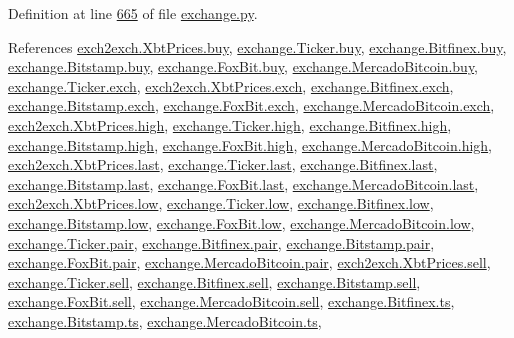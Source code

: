 Definition at line \hyperlink{exchange_8py_source_l00665}{665} of file \hyperlink{exchange_8py_source}{exchange.\+py}.



References \hyperlink{exch2exch_8py_source_l00059}{exch2exch.\+Xbt\+Prices.\+buy}, \hyperlink{exchange_8py_source_l00060}{exchange.\+Ticker.\+buy}, \hyperlink{exchange_8py_source_l00430}{exchange.\+Bitfinex.\+buy}, \hyperlink{exchange_8py_source_l00502}{exchange.\+Bitstamp.\+buy}, \hyperlink{exchange_8py_source_l00574}{exchange.\+Fox\+Bit.\+buy}, \hyperlink{exchange_8py_source_l00642}{exchange.\+Mercado\+Bitcoin.\+buy}, \hyperlink{exchange_8py_source_l00057}{exchange.\+Ticker.\+exch}, \hyperlink{exch2exch_8py_source_l00064}{exch2exch.\+Xbt\+Prices.\+exch}, \hyperlink{exchange_8py_source_l00424}{exchange.\+Bitfinex.\+exch}, \hyperlink{exchange_8py_source_l00499}{exchange.\+Bitstamp.\+exch}, \hyperlink{exchange_8py_source_l00567}{exchange.\+Fox\+Bit.\+exch}, \hyperlink{exchange_8py_source_l00639}{exchange.\+Mercado\+Bitcoin.\+exch}, \hyperlink{exch2exch_8py_source_l00061}{exch2exch.\+Xbt\+Prices.\+high}, \hyperlink{exchange_8py_source_l00062}{exchange.\+Ticker.\+high}, \hyperlink{exchange_8py_source_l00432}{exchange.\+Bitfinex.\+high}, \hyperlink{exchange_8py_source_l00504}{exchange.\+Bitstamp.\+high}, \hyperlink{exchange_8py_source_l00576}{exchange.\+Fox\+Bit.\+high}, \hyperlink{exchange_8py_source_l00644}{exchange.\+Mercado\+Bitcoin.\+high}, \hyperlink{exch2exch_8py_source_l00063}{exch2exch.\+Xbt\+Prices.\+last}, \hyperlink{exchange_8py_source_l00064}{exchange.\+Ticker.\+last}, \hyperlink{exchange_8py_source_l00434}{exchange.\+Bitfinex.\+last}, \hyperlink{exchange_8py_source_l00506}{exchange.\+Bitstamp.\+last}, \hyperlink{exchange_8py_source_l00578}{exchange.\+Fox\+Bit.\+last}, \hyperlink{exchange_8py_source_l00646}{exchange.\+Mercado\+Bitcoin.\+last}, \hyperlink{exch2exch_8py_source_l00062}{exch2exch.\+Xbt\+Prices.\+low}, \hyperlink{exchange_8py_source_l00063}{exchange.\+Ticker.\+low}, \hyperlink{exchange_8py_source_l00433}{exchange.\+Bitfinex.\+low}, \hyperlink{exchange_8py_source_l00505}{exchange.\+Bitstamp.\+low}, \hyperlink{exchange_8py_source_l00577}{exchange.\+Fox\+Bit.\+low}, \hyperlink{exchange_8py_source_l00645}{exchange.\+Mercado\+Bitcoin.\+low}, \hyperlink{exchange_8py_source_l00058}{exchange.\+Ticker.\+pair}, \hyperlink{exchange_8py_source_l00425}{exchange.\+Bitfinex.\+pair}, \hyperlink{exchange_8py_source_l00500}{exchange.\+Bitstamp.\+pair}, \hyperlink{exchange_8py_source_l00568}{exchange.\+Fox\+Bit.\+pair}, \hyperlink{exchange_8py_source_l00640}{exchange.\+Mercado\+Bitcoin.\+pair}, \hyperlink{exch2exch_8py_source_l00058}{exch2exch.\+Xbt\+Prices.\+sell}, \hyperlink{exchange_8py_source_l00061}{exchange.\+Ticker.\+sell}, \hyperlink{exchange_8py_source_l00431}{exchange.\+Bitfinex.\+sell}, \hyperlink{exchange_8py_source_l00503}{exchange.\+Bitstamp.\+sell}, \hyperlink{exchange_8py_source_l00575}{exchange.\+Fox\+Bit.\+sell}, \hyperlink{exchange_8py_source_l00643}{exchange.\+Mercado\+Bitcoin.\+sell}, \hyperlink{exchange_8py_source_l00428}{exchange.\+Bitfinex.\+ts}, \hyperlink{exchange_8py_source_l00501}{exchange.\+Bitstamp.\+ts}, \hyperlink{exchange_8py_source_l00641}{exchange.\+Mercado\+Bitcoin.\+ts}, 